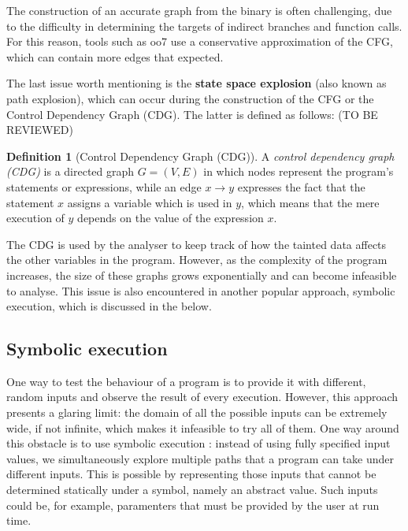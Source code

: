 \documentclass[12pt,a4paper]{book}
\theoremstyle{definition}
\newtheorem{defn}{Definition}
\begin{document}
	The construction of an accurate graph from the binary is often challenging, due to the difficulty in determining the targets of indirect branches and function calls. For this reason, tools such as oo7 \cite{Wang2019} use a conservative approximation of the CFG, which can contain more edges that expected.
	
	The last issue worth mentioning is the \textbf{state space explosion} (also known as path explosion), which can occur during the construction of the CFG or the Control Dependency Graph (CDG). The latter is defined as follows: (TO BE REVIEWED)
	
	\begin{defn}[Control Dependency Graph (CDG)]
		A \textit{control dependency graph (CDG)} \cite{Krinke2007} is a directed graph $G=(V,E)$ in which nodes represent the program's statements or expressions, while an edge $x\rightarrow y$ expresses the fact that the statement $x$ assigns a variable which is used in $y$, which means that the mere execution of $y$ depends on the value of the expression $x$. 
	\end{defn}
	The CDG is used by the analyser to keep track of how the tainted data affects the other variables in the program. However, as the complexity of the program increases, the size of these graphs grows exponentially and can become infeasible to analyse. This issue is also encountered in another popular approach, symbolic execution, which is discussed in the below. 
	\subsection{Symbolic execution}\label{sec:symbolic-exec}
	One way to test the behaviour of a program is to provide it with different, random inputs and observe the result of every execution. However, this approach presents a glaring limit: the domain of all the possible inputs can be extremely wide, if not infinite, which makes it infeasible to try all of them. One way around this obstacle is to use symbolic execution \cite{Baldoni2018} \cite{King76}: instead of using fully specified input values, we simultaneously explore multiple paths that a program can take under different inputs. This is possible by representing those inputs that cannot be determined statically under a symbol, namely an abstract value. Such inputs could be, for example, paramenters that must be provided by the user at run time.
	
\end{document}
